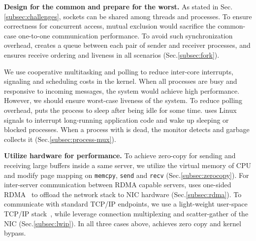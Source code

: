 
\textbf{Design for the common and prepare for the worst.}
As stated in Sec.\ref{subsec:challenges}, sockets can be shared among threads and processes. To ensure correctness for concurrent access, mutual exclusion would sacrifice the common-case one-to-one communication performance. To avoid such synchronization overhead, \libipc creates a queue between each pair of sender and receiver processes, and ensures receive ordering and liveness in all scenarios (Sec.\ref{subsec:fork}).

We use cooperative multitasking and polling to reduce inter-core interrupts, signaling and scheduling costs in the kernel. When all processes are busy and responsive to incoming messages, the system would achieve high performance. However, we should ensure worst-case liveness of the system. To reduce polling overhead, \libipc puts the process to sleep after being idle for some time. \libipc uses Linux signals to interrupt long-running application code and wake up sleeping or blocked processes. When a process with \libipc is dead, the monitor detects and garbage collects it (Sec.\ref{subsec:process-mux}).

\textbf{Utilize hardware for performance.}
To achieve zero-copy for sending and receiving large buffers inside a same server, we utilize the virtual memory of CPU and modify page mapping on \texttt{memcpy}, \texttt{send} and \texttt{recv} (Sec.\ref{subsec:zerocopy}). For inter-server communication between RDMA capable servers, \libipc{} uses one-sided RDMA~\cite{mitchell2013using,kaminsky2016design} to offload the network stack to NIC hardware (Sec.\ref{subsec:rdma}). To communicate with standard TCP/IP endpoints, we use a light-weight user-space TCP/IP stack~\cite{dunkels2001design}, while leverage connection multiplexing and scatter-gather of the NIC (Sec.\ref{subsec:lwip}). In all three cases above, \libipc{} achieves zero copy and kernel bypass. %


